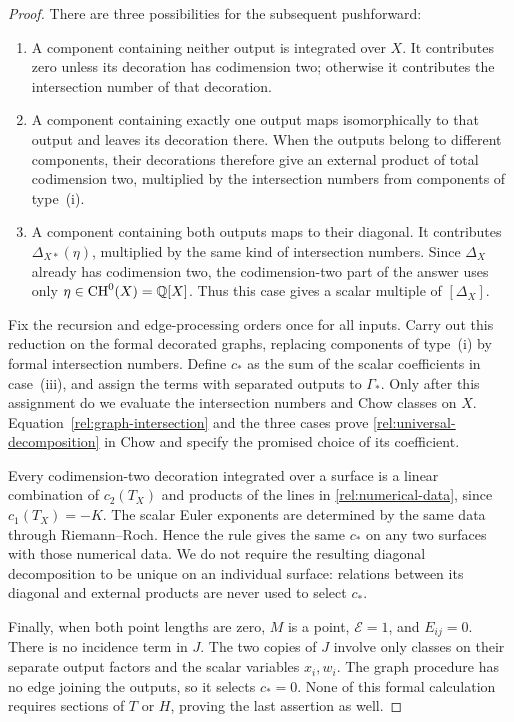 \begin{proof}
There are three possibilities for the subsequent pushforward:
\begin{enumerate}[label=\textup{(\roman*)}]
\item A component containing neither output is integrated over $X$.
It contributes zero unless its decoration has codimension two;
otherwise it contributes the intersection number of that decoration.
\item A component containing exactly one output maps isomorphically
to that output and leaves its decoration there.  When the outputs
belong to different components, their decorations therefore give an
external product of total codimension two, multiplied by the
intersection numbers from components of type~\textup{(i)}.
\item A component containing both outputs maps to their diagonal.
It contributes $\Delta_{X*}(\eta)$, multiplied by the same kind of
intersection numbers.  Since $\Delta_X$ already has codimension two,
the codimension-two part of the answer uses only
$\eta\in\operatorname{CH}^0(X)=\mathbb Q[X]$.  Thus this case gives a scalar
multiple of $[\Delta_X]$.
\end{enumerate}

Fix the recursion and edge-processing orders once for all inputs.
Carry out this reduction on the formal decorated graphs, replacing
components of type~\textup{(i)} by formal intersection numbers.
Define $c_*$ as the sum of the scalar coefficients in
case~\textup{(iii)}, and assign the terms with separated outputs to
$\Gamma_*$.  Only after this assignment do we evaluate the
intersection numbers and Chow classes on $X$.
Equation~\eqref{rel:graph-intersection} and the three cases prove
\eqref{rel:universal-decomposition} in Chow and specify the promised
choice of its coefficient.

Every codimension-two decoration integrated over a surface is a
linear combination of $c_2(T_X)$ and products of the lines in
\eqref{rel:numerical-data}, since $c_1(T_X)=-K$.
The scalar Euler exponents are determined by the same data through
Riemann--Roch.  Hence the rule gives the same $c_*$ on any two
surfaces with those numerical data.  We do not require the resulting
diagonal decomposition to be unique on an individual surface:
relations between its diagonal and external products are never
used to select $c_*$.

Finally, when both point lengths are zero, $M$ is a point,
$\mathcal E=1$, and $E_{ij}=0$.  There is no incidence term in $J$.
The two copies of $J$ involve only classes on their separate output
factors and the scalar variables $x_i,w_i$.  The graph procedure has
no edge joining the outputs, so it selects $c_*=0$.  None of this
formal calculation requires sections of $T$ or $H$, proving the last
assertion as well.
\end{proof}

